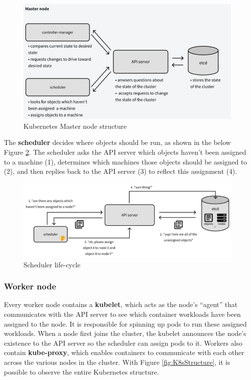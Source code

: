 \begin{figure} [H]
    \centering
    \includegraphics[width=1\textwidth]{images/Cloud/K8sMaster.png}
    \caption{Kubernetes Master node structure}
    \label{fig:K8sMaster}
\end{figure}
\newpage
The \textbf{scheduler} decides where objects should be run, as shown in the below Figure \ref{fig:K8sMasterScheduler}. The scheduler asks the API server which objects haven't been assigned to a machine (1), determines which machines those objects should be assigned to (2), and then replies back to the API server (3) to reflect this assignment (4).

\begin{figure} [H]
    \centering
    \includegraphics[width=1\textwidth]{images/Cloud/K8sMasterScheduler.png}
    \caption{Scheduler life-cycle}
    \label{fig:K8sMasterScheduler}
\end{figure}

\subsubsection{Worker node}

Every worker node contains a \textbf{kubelet}, which acts as the node's ``agent'' that communicates with the API server to see which container workloads have been assigned to the node. It is responsible for spinning up pods to run these assigned workloads. When a node first joins the cluster, the kubelet announces the node's existence to the API server so the scheduler can assign pods to it.
Workers also contain \textbf{kube-proxy}, which enables containers to communicate with each other across the various nodes in the cluster. With Figure \ref{fig:K8sStructure}, it is possible to observe the entire Kubernetes structure.

